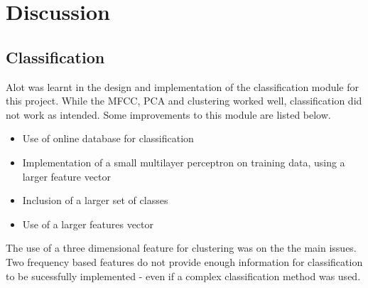 \section{Discussion}

\subsection{Classification}
Alot was learnt in the design and implementation of the classification module for this project. While the MFCC, PCA and clustering worked well, classification did not work as intended. Some improvements to this module are listed below. 
\begin{itemize}
  \item Use of online database for classification
  \item Implementation of a small multilayer perceptron on training data, using a larger feature vector
  \item Inclusion of a larger set of classes
  \item Use of a larger features vector
\end{itemize}
The use of a three dimensional feature for clustering was on the the main issues. Two frequency based features do not provide enough information for classification to be sucessfully implemented - even if a complex classification method was used.
